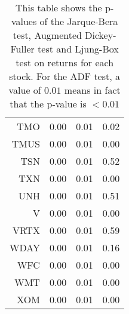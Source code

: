 \begin{table}[ht]
\begin{tabular}{rrrr}
  TMO & 0.00 & 0.01 & 0.02 \\ 
  TMUS & 0.00 & 0.01 & 0.00 \\ 
  TSN & 0.00 & 0.01 & 0.52 \\ 
  TXN & 0.00 & 0.01 & 0.00 \\ 
  UNH & 0.00 & 0.01 & 0.51 \\ 
  V & 0.00 & 0.01 & 0.00 \\ 
  VRTX & 0.00 & 0.01 & 0.59 \\ 
  WDAY & 0.00 & 0.01 & 0.16 \\ 
  WFC & 0.00 & 0.01 & 0.00 \\ 
  WMT & 0.00 & 0.01 & 0.00 \\ 
  XOM & 0.00 & 0.01 & 0.00 \\ 
   \hline
\end{tabular}
\caption[JB test, ADF test, LB text on returns.]{This table shows the p-values of the Jarque-Bera test, Augmented Dickey-Fuller test and Ljung-Box test 
                     on returns for each stock. For the ADF test, a value of $0.01$ means in fact that the p-value is $<0.01$} 
\label{Table:Rets_p_vals}
\end{table}
